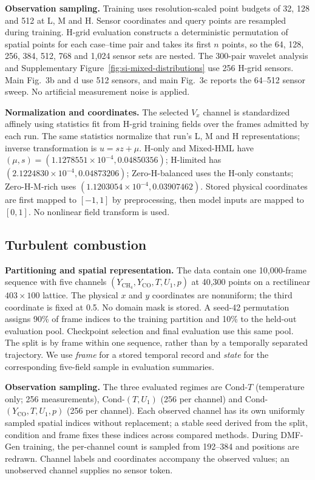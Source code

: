 \documentclass[11pt]{article}
\newcommand{\sisubsection}[1]{%
\FloatBarrier
\Needspace{5\baselineskip}%
\subsection{#1}%
}
\newcommand{\detail}[1]{\par\Needspace{4\baselineskip}\textbf{#1}\enspace}
\begin{document}
\detail{Observation sampling.} Training uses resolution-scaled point budgets of 32, 128 and 512 at L, M and H. Sensor coordinates and query points are resampled during training. H-grid evaluation constructs a deterministic permutation of spatial points for each case--time pair and takes its first $n$ points, so the 64, 128, 256, 384, 512, 768 and 1,024 sensor sets are nested. The 300-pair wavelet analysis and Supplementary Figure~\ref{fig:si-mixed-distributions} use 256 H-grid sensors. Main Fig.~3b and d use 512 sensors, and main Fig.~3c reports the 64--512 sensor sweep. No artificial measurement noise is applied.

\detail{Normalization and coordinates.} The selected $V_x$ channel is standardized affinely using statistics fit from H-grid training fields over the frames admitted by each run. The same statistics normalize that run's L, M and H representations; inverse transformation is $u=sz+\mu$. H-only and Mixed-HML have $(\mu,s)=(1.1278551\times10^{-4},0.04850356)$; H-limited has $(2.1224830\times10^{-4},0.04873206)$; Zero-H-balanced uses the H-only constants; Zero-H-M-rich uses $(1.1203054\times10^{-4},0.03907462)$. Stored physical coordinates are first mapped to $[-1,1]$ by preprocessing, then model inputs are mapped to $[0,1]$. No nonlinear field transform is used.

\sisubsection{Turbulent combustion}
\label{subsec:data-combustion}
\detail{Partitioning and spatial representation.} The data contain one 10,000-frame sequence with five channels $(Y_{\mathrm{CH_4}},Y_{\mathrm{CO}},T,U_1,p)$ at 40,300 points on a rectilinear $403\times100$ lattice. The physical $x$ and $y$ coordinates are nonuniform; the third coordinate is fixed at 0.5. No domain mask is stored. A seed-42 permutation assigns 90\% of frame indices to the training partition and 10\% to the held-out evaluation pool. Checkpoint selection and final evaluation use this same pool. The split is by frame within one sequence, rather than by a temporally separated trajectory. We use \emph{frame} for a stored temporal record and \emph{state} for the corresponding five-field sample in evaluation summaries.

\detail{Observation sampling.} The three evaluated regimes are Cond-$T$ (temperature only; 256 measurements), Cond-$(T,U_1)$ (256 per channel) and Cond-$(Y_{\mathrm{CO}},T,U_1,p)$ (256 per channel). Each observed channel has its own uniformly sampled spatial indices without replacement; a stable seed derived from the split, condition and frame fixes these indices across compared methods. During DMF-Gen training, the per-channel count is sampled from 192--384 and positions are redrawn. Channel labels and coordinates accompany the observed values; an unobserved channel supplies no sensor token.
\end{document}
